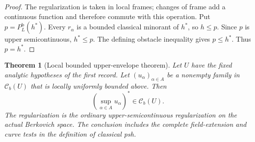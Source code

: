 \documentclass[11pt,a4paper]{article}
\numberwithin{equation}{section}
\newtheorem{theorem}{Theorem}[section]
\theoremstyle{definition}
\theoremstyle{remark}
\newcommand{\Cb}{\mathcal C_b}
\begin{document}
\begin{proof}
The regularization is taken in local frames; changes of frame add a
continuous function and therefore commute with this operation. Put
$p=P_L^{\mathrm b}(h^*)$. Every $r_\alpha$ is a bounded classical
minorant of $h^*$, so $h\leq p$. Since $p$ is upper semicontinuous,
$h^*\leq p$. The defining obstacle inequality gives $p\leq h^*$.
Thus $p=h^*$.
\end{proof}

\begin{theorem}[Local bounded upper-envelope theorem]
\label{thm:r2-local-upper-envelope}
Let $U$ have the fixed analytic hypotheses of the first record. Let
$(u_\alpha)_{\alpha\in A}$ be a nonempty family in $\Cb(U)$ that is
locally uniformly bounded above. Then
\[
 \left(\sup_{\alpha\in A}u_\alpha\right)^*\in\Cb(U).
\]
The regularization is the ordinary upper-semicontinuous regularization
on the actual Berkovich space. The conclusion includes the complete
field-extension and curve tests in the definition of classical psh.
\end{theorem}
\end{document}

